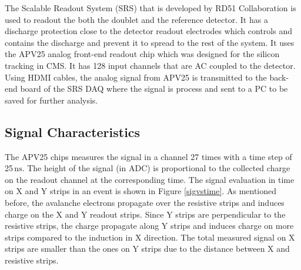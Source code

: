 \documentclass[a4paper,11pt]{article}
\newcommand{\myunit}[1]{$\, \mathrm{#1}$}
\begin{document}
The Scalable Readout System (SRS) \cite{Martoiu:2013aca} that is developed by RD51 Collaboration \cite{web-rd51} is used to readout the both the doublet and the reference detector. It has a discharge protection close to the detector readout electrodes which controls and contains the discharge and prevent it to spread to the rest of the system. It uses the APV25 \cite{APVJones, APVCMS} analog front-end readout chip which was designed for the silicon tracking in CMS. It has 128 input channels that are AC coupled to the detector.  Using HDMI cables, the analog signal from APV25 is transmitted to the back-end board of the SRS DAQ where the signal is process and sent to a PC to be saved for further analysis. 



\subsection{Signal Characteristics}

The APV25 chips measures the signal in a channel 27 times with a time step of 25\myunit{ns}. The height of the signal (in ADC) is proportional to the collected charge on the readout channel at the corresponding time. The signal evaluation in time on X and Y strips in an event is shown in Figure \ref{sigvstime}. As mentioned before, the avalanche electrons propagate over the resistive strips and induces charge on the X and Y readout strips. Since Y strips are perpendicular to the resistive strips, the charge propagate along Y strips and induces charge on more strips compared to the induction in X direction. The total measured signal on X strips are smaller than the ones on Y strips due to the distance between X and resistive strips.
\end{document}
